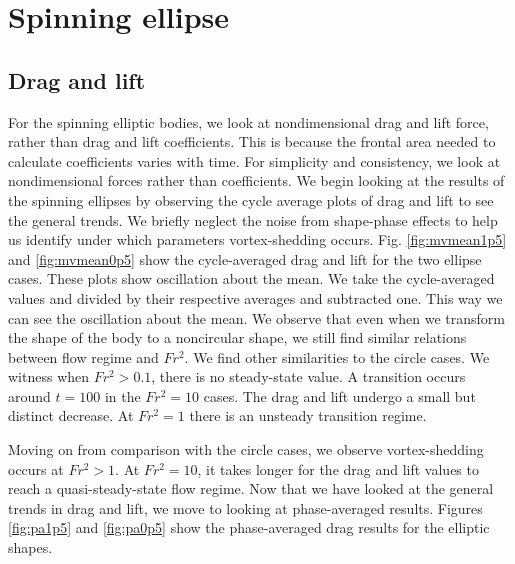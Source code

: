 \section{Spinning ellipse}
\label{section:Spinning_ellipse}
\subsection{Drag and lift}
For the spinning elliptic bodies, we look at nondimensional drag and lift force, rather than drag and lift coefficients. This is because the frontal area needed to calculate coefficients varies with time. For simplicity and consistency, we look at nondimensional forces rather than coefficients. We begin looking at the results of the spinning ellipses by observing the cycle average plots of drag and lift to see the general trends. We briefly neglect the noise from shape-phase effects to help us identify under which parameters vortex-shedding occurs. Fig. \ref{fig:mvmean1p5} and \ref{fig:mvmean0p5} show the cycle-averaged drag and lift for the two ellipse cases. These plots show oscillation about the mean. We take the cycle-averaged values and divided by their respective averages and subtracted one. This way we can see the oscillation about the mean. We observe that even when we transform the shape of the body to a noncircular shape, we still find similar relations between flow regime and $Fr^2$. We find other similarities to the circle cases. We witness when $Fr^2 > 0.1$, there is no steady-state value. A transition occurs around $t = 100$ in the $Fr^2 = 10$ cases. The drag and lift undergo a small but distinct decrease. At $Fr^2 = 1$ there is an unsteady transition regime. 

Moving on from comparison with the circle cases, we observe vortex-shedding occurs at $Fr^2 > 1$. At $Fr^2 = 10$, it takes longer for the drag and lift values to reach a quasi-steady-state flow regime. Now that we have looked at the general trends in drag and lift, we move to looking at phase-averaged results. Figures \ref{fig:pa1p5} and \ref{fig:pa0p5} show the phase-averaged drag results for the elliptic shapes. 

